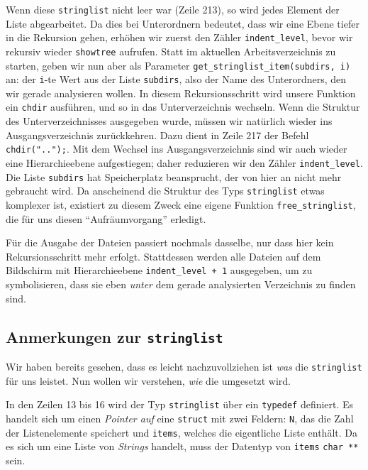 Wenn diese \texttt{stringlist} nicht leer war (Zeile 213), so wird jedes Element der Liste abgearbeitet. Da dies bei Unterordnern bedeutet, dass wir eine Ebene tiefer in die Rekursion gehen, erhöhen wir zuerst den Zähler \texttt{indent\_level}, bevor wir rekursiv wieder \texttt{showtree} aufrufen. Statt im aktuellen Arbeitsverzeichnis zu starten, geben wir nun aber als Parameter 
\texttt{get\_stringlist\_item(subdirs, i)} an: der \texttt{i}-te Wert aus der Liste \texttt{subdirs}, also der Name des Unterordners, den wir gerade analysieren wollen. In diesem Rekursionsschritt wird unsere Funktion ein \texttt{chdir} ausführen, und so in das Unterverzeichnis wechseln. Wenn die Struktur des Unterverzeichnisses ausgegeben wurde, müssen wir natürlich wieder ins Ausgangsverzeichnis zurückkehren. Dazu dient in Zeile 217 der Befehl \texttt{chdir("..");}. Mit dem Wechsel ins Ausgangsverzeichnis sind wir auch wieder eine Hierarchieebene aufgestiegen; daher reduzieren wir den Zähler \texttt{indent\_level}. Die Liste \texttt{subdirs} hat Speicherplatz beansprucht, der von hier an nicht mehr gebraucht wird. Da anscheinend die Struktur des Typs \texttt{stringlist} etwas komplexer ist, existiert zu diesem Zweck eine eigene Funktion \texttt{free\_stringlist}, die für uns diesen \enquote{Aufräumvorgang} erledigt.

Für die Ausgabe der Dateien passiert nochmals dasselbe, nur dass hier kein Rekursionsschritt mehr erfolgt. Stattdessen werden alle Dateien auf dem Bildschirm mit Hierarchieebene 
\texttt{indent\_level + 1} ausgegeben, um zu symbolisieren, dass sie eben \emph{unter} dem gerade analysierten Verzeichnis zu finden sind.

\subsection{Anmerkungen zur \texttt{stringlist}}
Wir haben bereits gesehen, dass es leicht nachzuvollziehen ist \emph{was} die \texttt{stringlist} für uns leistet. Nun wollen wir verstehen, \emph{wie} die umgesetzt wird.

In den Zeilen 13 bis 16 wird der Typ \texttt{stringlist} über ein \texttt{typedef} definiert. Es handelt sich um einen \emph{Pointer auf} eine \texttt{struct} mit zwei Feldern: \texttt{N}, das die Zahl der Listenelemente speichert und \texttt{items}, welches die eigentliche Liste enthält. Da es sich um eine Liste von \emph{Strings} handelt, muss der Datentyp von \texttt{items} \texttt{char **} sein.


